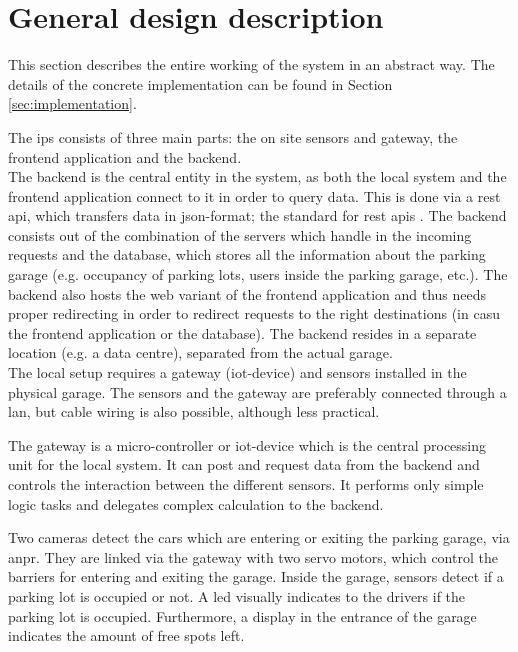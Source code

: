 \section{General design description}\label{sec:general design}
This section describes the entire working of the system in an abstract way. The details of the concrete implementation can be found in Section \ref{sec:implementation}.

\ind The \ac{ips} consists of three main parts: the on site sensors and gateway, the frontend application and the backend. \\

The backend is the central entity in the system, as both the local system and the frontend application connect to it in order to query data. This is done via a \ac{rest} \ac{api}, which transfers data in \ac{json}-format; the standard for \ac{rest} \ac{api}s \cite{rest_apis}. The backend consists out of the combination of the servers which handle in the incoming requests and the database, which stores all the information about the parking garage (e.g. occupancy of parking lots, users inside the parking garage, etc.).
The backend also hosts the web variant of the frontend application and thus needs proper redirecting in order to redirect requests to the right destinations (in casu the frontend application or the database). The backend resides in a separate location (e.g. a data centre), separated from the actual garage. \\

The local setup requires a gateway  (\ac{iot}-device) and sensors installed in the physical garage. The sensors and the gateway are preferably connected through a \ac{lan}, but cable wiring is also possible, although less practical.

\ind The gateway is a micro-controller or \ac{iot}-device which is the central processing unit for the local system. It can post and request data from the backend and controls the interaction between the different sensors. It performs only simple logic tasks and delegates complex calculation to the backend.

\ind Two cameras detect the cars which are entering or exiting the parking garage, via \ac{anpr}. They are linked via the gateway with two servo motors, which control the barriers for entering and exiting the garage. Inside the garage, sensors detect if a parking lot is occupied or not. A \ac{led} visually indicates to the drivers if the parking lot is occupied. Furthermore, a display in the entrance of the garage indicates the amount of free spots left. \\

